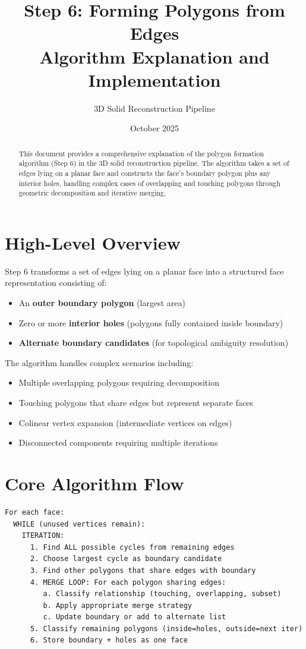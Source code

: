 \documentclass[11pt]{article}
\title{\textbf{Step 6: Forming Polygons from Edges} \\
\large Algorithm Explanation and Implementation}
\author{3D Solid Reconstruction Pipeline}
\date{October 2025}
\begin{document}
\maketitle

\begin{abstract}
This document provides a comprehensive explanation of the polygon formation algorithm (Step 6) in the 3D solid reconstruction pipeline. The algorithm takes a set of edges lying on a planar face and constructs the face's boundary polygon plus any interior holes, handling complex cases of overlapping and touching polygons through geometric decomposition and iterative merging.
\end{abstract}

\tableofcontents
\newpage

\section{High-Level Overview}

Step 6 transforms a set of edges lying on a planar face into a structured face representation consisting of:
\begin{itemize}
    \item An \textbf{outer boundary polygon} (largest area)
    \item Zero or more \textbf{interior holes} (polygons fully contained inside boundary)
    \item \textbf{Alternate boundary candidates} (for topological ambiguity resolution)
\end{itemize}

The algorithm handles complex scenarios including:
\begin{itemize}
    \item Multiple overlapping polygons requiring decomposition
    \item Touching polygons that share edges but represent separate faces
    \item Colinear vertex expansion (intermediate vertices on edges)
    \item Disconnected components requiring multiple iterations
\end{itemize}

\section{Core Algorithm Flow}

\begin{lstlisting}[caption={High-level algorithm structure},label={lst:highlevel}]
For each face:
  WHILE (unused vertices remain):
    ITERATION:
      1. Find ALL possible cycles from remaining edges
      2. Choose largest cycle as boundary candidate
      3. Find other polygons that share edges with boundary
      4. MERGE LOOP: For each polygon sharing edges:
         a. Classify relationship (touching, overlapping, subset)
         b. Apply appropriate merge strategy
         c. Update boundary or add to alternate list
      5. Classify remaining polygons (inside=holes, outside=next iter)
      6. Store boundary + holes as one face
\end{lstlisting}
\end{document}
